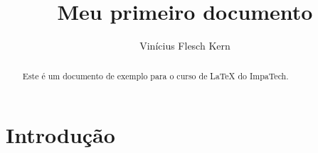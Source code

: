 \documentclass[11pt,a4paper,oneside]{article}
\title{Meu primeiro documento}
\author{Vinícius Flesch Kern}
\begin{document}
\frenchspacing

\maketitle

\begin{abstract}
  Este é um documento de exemplo para o curso de \LaTeX{} do ImpaTech.
\end{abstract}

\tableofcontents

\section{Introdução}
\begin{equation}
    
\end{equation}
\end{document}
